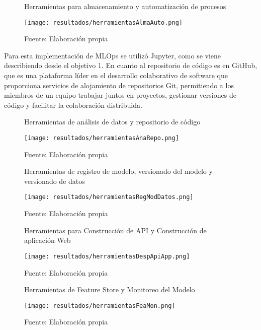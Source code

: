 \newpage

\begin{figure}[h]
\centering
\caption{Herramientas para almacenamiento y automatización de procesos}
\texttt{[image: resultados/herramientasAlmaAuto.png]}
\caption*{\footnotesize Fuente: Elaboración propia}
\label{fig:figuraHerramientasAlmaAuto}
\end{figure}

Para esta implementación de MLOps se utilizó Jupyter, como se viene describiendo desde el objetivo 1. En cuanto al repositorio de código es en GitHub, que es una plataforma líder en el desarrollo colaborativo de software que proporciona servicios de alojamiento de repositorios Git, permitiendo a los miembros de un equipo trabajar juntos en proyectos, gestionar versiones de código y facilitar la colaboración distribuida.

\newpage

\begin{figure}[h]
\centering
\caption{Herramientas de análisis de datos y repositorio de código}
\texttt{[image: resultados/herramientasAnaRepo.png]}
\caption*{\footnotesize Fuente: Elaboración propia}
\label{fig:figuraHerramientasAnaRepo}
\end{figure}

\newpage

\begin{figure}[h]
\centering
\caption{Herramientas de registro de modelo, versionado del modelo y versionado de datos}
\texttt{[image: resultados/herramientasRegModDatos.png]}
\caption*{\footnotesize Fuente: Elaboración propia}
\label{fig:figuraHerramientasRegModDatos}
\end{figure}

\begin{figure}[h]
\centering
\caption{Herramientas para Construcción de API y Construcción de aplicación Web}
\texttt{[image: resultados/herramientasDespApiApp.png]}
\caption*{\footnotesize Fuente: Elaboración propia}
\label{fig:figuraHerramientasDespApiApp}
\end{figure}

\newpage

\begin{figure}[h]
\centering
\caption{Herramientas de Feature Store y Monitoreo del Modelo}
\texttt{[image: resultados/herramientasFeaMon.png]}
\caption*{\footnotesize Fuente: Elaboración propia}
\label{fig:figuraHerramientasFeaMon}
\end{figure}

